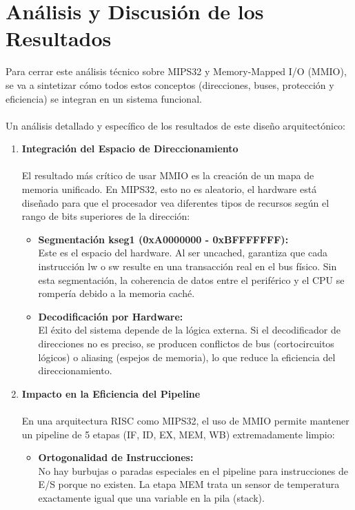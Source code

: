 \documentclass[]{article}
\begin{document}
\section{Análisis y Discusión de los Resultados}
	Para cerrar este análisis técnico sobre MIPS32 y Memory-Mapped I/O (MMIO), se va a sintetizar cómo todos estos conceptos (direcciones, buses, protección y eficiencia) se integran en un sistema funcional.
	\\\\
	Un análisis detallado y específico de los resultados de este diseño arquitectónico:
	\begin{enumerate}
		\item \textbf{Integración del Espacio de Direccionamiento}\\\\
			El resultado más crítico de usar MMIO es la creación de un mapa de memoria unificado. En MIPS32, esto no es aleatorio, el hardware está diseñado para que el procesador vea diferentes tipos de recursos según el rango de bits superiores de la dirección:
			\begin{itemize}
				\item \textbf{Segmentación kseg1 (0xA0000000 - 0xBFFFFFFF):}\\ Este es el espacio del hardware. Al ser uncached, garantiza que cada instrucción lw o sw resulte en una transacción real en el bus físico. Sin esta segmentación, la coherencia de datos entre el periférico y el CPU se rompería debido a la memoria caché.
				\item  \textbf{Decodificación por Hardware:}\\ El éxito del sistema depende de la lógica externa. Si el decodificador de direcciones no es preciso, se producen conflictos de bus (cortocircuitos lógicos) o aliasing (espejos de memoria), lo que reduce la eficiencia del direccionamiento.
			\end{itemize}
		\item \textbf{Impacto en la Eficiencia del Pipeline}\\\\
			En una arquitectura RISC como MIPS32, el uso de MMIO permite mantener un pipeline de 5 etapas (IF, ID, EX, MEM, WB) extremadamente limpio:
			\begin{itemize}
				\item \textbf{Ortogonalidad de Instrucciones:}\\
				No hay burbujas o paradas especiales en el pipeline para instrucciones de E/S porque no existen. La etapa MEM trata un sensor de temperatura exactamente igual que una variable en la pila (stack).

\end{itemize}
\end{enumerate}
\end{document}
